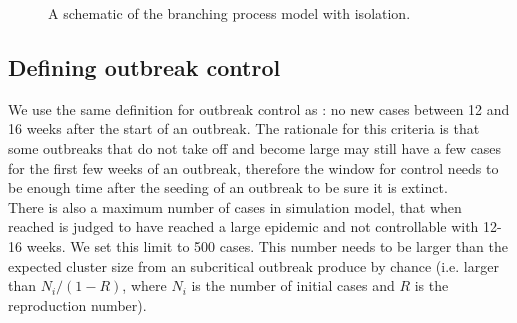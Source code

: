 \documentclass{article}
\begin{document}
\begin{figure}[ht]
{
}
\caption{A schematic of the branching process model with isolation.}
\label{fig:ringbp-model}
\end{figure}

\subsection*{Defining outbreak control}

We use the same definition for outbreak control as \cite{hellewellFeasibilityControllingCOVID192020}: no new cases between 12 and 16 weeks after the start of an outbreak. The rationale for this criteria is that some outbreaks that do not take off and become large may still have a few cases for the first few weeks of an outbreak, therefore the window for control needs to be enough time after the seeding of an outbreak to be sure it is extinct. \\

There is also a maximum number of cases in simulation model, that when reached is judged to have reached a large epidemic and not controllable with 12-16 weeks. We set this limit to 500 cases. This number needs to be larger than the expected cluster size from an subcritical outbreak produce by chance (i.e. larger than $N_i / (1 - R)$, where $N_i$ is the number of initial cases and $R$ is the reproduction number).
\end{document}
